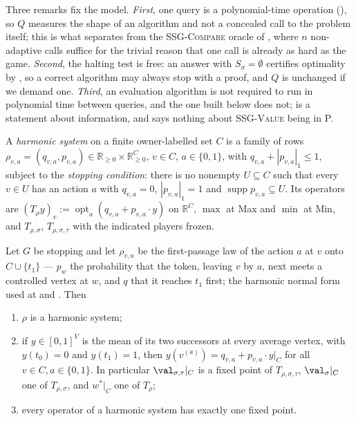 Three remarks fix the model.  \emph{First}, one query is a polynomial-time
operation (), so $Q$ measures the shape of an
algorithm and not a concealed call to the problem itself; this is what
separates  from the \textsc{SSG-Compare} oracle of
, where $n$ non-adaptive calls suffice for
the trivial reason that one call is already as hard as the game.
\emph{Second}, the halting test is free: an answer with $S_\sigma=\emptyset$
certifies optimality by , so a correct algorithm may
always stop with a proof, and $Q$ is unchanged if we demand one.
\emph{Third}, an evaluation algorithm is not required to run in polynomial
time between queries, and the one built below does not; 
is a statement about information, and says nothing about
\textsc{SSG-Value} being in \textsf{P}.

\begin{definition}\label{def:qm-harmonic}
A \emph{harmonic system} on a finite owner-labelled set $C$ is a family of
rows $\rho_{v,a}=(q_{v,a},p_{v,a})\in\mathbb R_{\ge0}\times\mathbb R_{\ge0}^{C}$,
$v\in C$, $a\in\{0,1\}$, with $q_{v,a}+|p_{v,a}|_1\le1$, subject to the
\emph{stopping condition}: there is no nonempty $U\subseteq C$ such that
every $v\in U$ has an action $a$ with $q_{v,a}=0$, $|p_{v,a}|_1=1$ and
$\operatorname{supp}p_{v,a}\subseteq U$.  Its operators are
$(T_\rho y)_v:=\operatorname{opt}_a(q_{v,a}+p_{v,a}\cdot y)$ on $\mathbb R^{C}$,
$\max$ at Max and $\min$ at Min, and $T_{\rho,\sigma}$, $T_{\rho,\sigma,\tau}$
with the indicated players frozen.
\end{definition}

\begin{lemma}\label{lem:qm-form}
Let $G$ be stopping and let $\rho_{v,a}$ be the first-passage law of the
action $a$ at $v$ onto $C\cup\{t_1\}$ --- $p_w$ the probability that the
token, leaving $v$ by $a$, next meets a controlled vertex at $w$, and $q$
that it reaches $t_1$ first; the harmonic normal form used at
 and .  Then
\begin{enumerate}[label=(\alph*),leftmargin=2.2em]
\item $\rho$ is a harmonic system;
\item if $y\in[0,1]^{V}$ is the mean of its two successors at every average
      vertex, with $y(t_0)=0$ and $y(t_1)=1$, then
      $y(v^{(a)})=q_{v,a}+p_{v,a}\cdot y|_{C}$ for all $v\in C,a\in\{0,1\}$.
      In particular $\val_{\sigma,\tau}|_C$ is a fixed point of
      $T_{\rho,\sigma,\tau}$, $\val_\sigma|_C$ one of $T_{\rho,\sigma}$, and
      $w^\ast|_C$ one of $T_\rho$;
\item every operator of a harmonic system has exactly one fixed point.
\end{enumerate}
\end{lemma}

